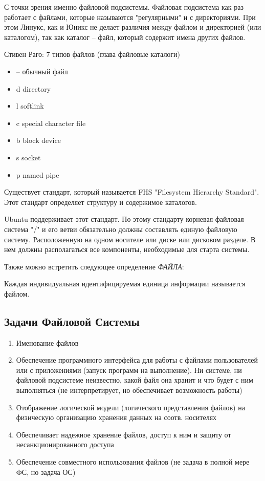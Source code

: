 \documentclass[a4paper,12pt]{article}
\begin{document}
С точки зрения именно файловой подсистемы. Файловая подсистема как раз работает с файлами, которые называются "регулярными" и с директориями. При этом Линукс, как и Юникс не делает различия между файлом и директорией (или каталогом), так как каталог -- файл, который содержит имена других файлов.

Стивен Раго: 7 типов файлов (глава файловые каталоги)

\begin{itemize}
	\item -- обычный файл
	\item d directory
	\item l softlink
	\item c special character file
	\item b block device
	\item s socket
	\item p named pipe
\end{itemize}

Существует стандарт, который называется FHS "Filesystem Hierarchy Standard". Этот стандарт определяет структуру и содержимое каталогов.

Ubuntu поддерживает этот стандарт. По этому стандарту корневая файловая система "/" и его ветви обязательно должны составлять единую файловую систему. Расположенную на одном носителе или диске или дисковом разделе. В нем должны располагаться все компоненты, необходимые для старта системы.

Также можно встретить следующее определение \textit{ФАЙЛА}:

Каждая индивидуальная идентифицируемая единица информации называется файлом.

\subsection{Задачи Файловой Системы}

\begin{enumerate}
	\item Именование файлов
	\item Обеспечение программного интерфейса для работы с файлами пользователей или с приложениями (запуск программ на выполнение). Ни системе, ни файловой подсистеме неизвестно, какой файл она хранит и что будет с ним выполняться (не интерпретирует, но обеспечивает возможность работы)
	\item Отображение логической модели (логического представления файлов) на физическую организацию хранения данных на соотв. носителях
	\item Обеспечивает надежное хранение файлов, доступ к ним и защиту от несанкционированного доступа
	\item Обеспечение совместного использования файлов (не задача в полной мере ФС, но задача ОС)
\end{enumerate}
\end{document}
